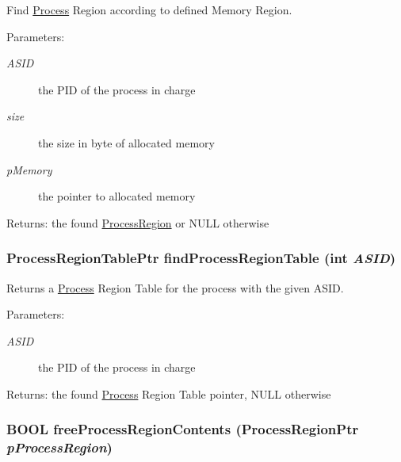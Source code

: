 Find \hyperlink{struct_process}{Process} Region according to defined Memory Region. \begin{Desc}
\item[Parameters:]
\begin{description}
\item[{\em ASID}]the PID of the process in charge \item[{\em size}]the size in byte of allocated memory \item[{\em pMemory}]the pointer to allocated memory \end{description}
\end{Desc}
\begin{Desc}
\item[Returns:]the found \hyperlink{struct_process_region}{ProcessRegion} or NULL otherwise \end{Desc}
\hypertarget{group___v_m_m___p_r_t_g1a235146354b478aebb943e89d11ebb7}{
\subsubsection[{findProcessRegionTable}]{\setlength{\rightskip}{0pt plus 5cm}ProcessRegionTablePtr findProcessRegionTable (int {\em ASID})}}
\label{group___v_m_m___p_r_t_g1a235146354b478aebb943e89d11ebb7}


Returns a \hyperlink{struct_process}{Process} Region Table for the process with the given ASID. \begin{Desc}
\item[Parameters:]
\begin{description}
\item[{\em ASID}]the PID of the process in charge \end{description}
\end{Desc}
\begin{Desc}
\item[Returns:]the found \hyperlink{struct_process}{Process} Region Table pointer, NULL otherwise \end{Desc}
\hypertarget{group___v_m_m___p_r_t_gd3367b77c8075f072fd9cbdcce6ed3c8}{
\subsubsection[{freeProcessRegionContents}]{\setlength{\rightskip}{0pt plus 5cm}BOOL freeProcessRegionContents ({\bf ProcessRegionPtr} {\em pProcessRegion})}}
\label{group___v_m_m___p_r_t_gd3367b77c8075f072fd9cbdcce6ed3c8}


